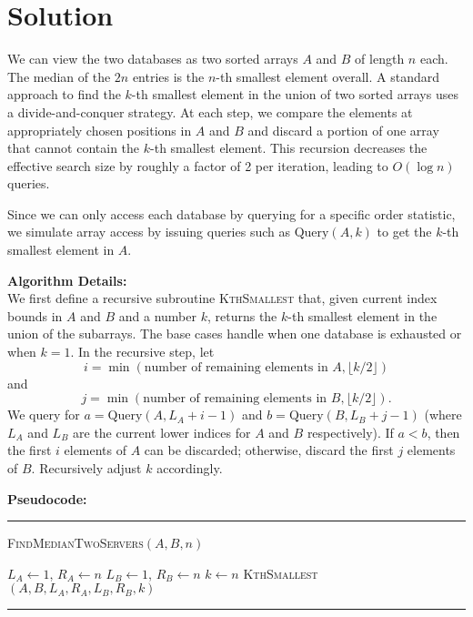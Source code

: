 \documentclass[11pt]{article}
\begin{document}
    \section*{Solution}
    We can view the two databases as two sorted arrays \( A \) and \( B \) of length \( n \) each. The median of the \( 2n \) entries is the \( n \)-th smallest element overall. A standard approach to find the \( k \)-th smallest element in the union of two sorted arrays uses a divide-and-conquer strategy. At each step, we compare the elements at appropriately chosen positions in \( A \) and \( B \) and discard a portion of one array that cannot contain the \( k \)-th smallest element. This recursion decreases the effective search size by roughly a factor of 2 per iteration, leading to \( O(\log n) \) queries.
    
    Since we can only access each database by querying for a specific order statistic, we simulate array access by issuing queries such as \(\text{Query}(A, k)\) to get the \( k \)-th smallest element in \( A \).
    
    \bigskip
    
    \textbf{Algorithm Details:} \\
    We first define a recursive subroutine \textsc{KthSmallest} that, given current index bounds in \( A \) and \( B \) and a number \( k \), returns the \( k \)-th smallest element in the union of the subarrays. The base cases handle when one database is exhausted or when \( k = 1 \). In the recursive step, let
    \[
    i = \min(\text{number of remaining elements in } A, \lfloor k/2 \rfloor)
    \]
    and
    \[
    j = \min(\text{number of remaining elements in } B, \lfloor k/2 \rfloor).
    \]
    We query for \( a = \text{Query}(A, L_A+i-1) \) and \( b = \text{Query}(B, L_B+j-1) \) (where \( L_A \) and \( L_B \) are the current lower indices for \( A \) and \( B \) respectively). If \( a < b \), then the first \( i \) elements of \( A \) can be discarded; otherwise, discard the first \( j \) elements of \( B \). Recursively adjust \( k \) accordingly.
    
    \bigskip
    
    \textbf{Pseudocode:}
    
    \par\noindent\rule{\textwidth}{0.4pt}
    \smallskip        
    \textsc{FindMedianTwoServers}$(A, B, n)$
    \begin{algorithmic}[1]
        \STATE $L_A \gets 1$, $R_A \gets n$
        \STATE $L_B \gets 1$, $R_B \gets n$
        \STATE $k \gets n$
        \RETURN \textsc{KthSmallest}$(A, B, L_A, R_A, L_B, R_B, k)$
    \end{algorithmic}
    \vspace{-2mm}
    \par\noindent\rule{\textwidth}{0.4pt}
    
\end{document}

